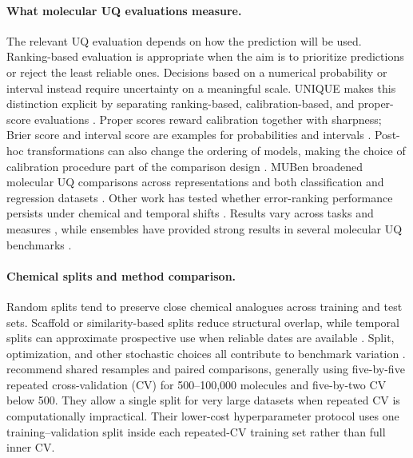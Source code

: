 \paragraph{What molecular UQ evaluations measure.}
The relevant UQ evaluation depends on how the prediction will be used. Ranking-based evaluation is
appropriate when the aim is to prioritize predictions or reject the least reliable ones. Decisions based on a
numerical probability or interval instead require uncertainty on a meaningful scale. UNIQUE makes
this distinction explicit by separating ranking-based, calibration-based, and proper-score
evaluations \citep{lanini2024unique}. Proper scores reward calibration together with sharpness;
Brier score and interval score are
examples for probabilities and intervals \citep{gneiting2007strictly}. Post-hoc transformations can
also change the ordering of models, making the choice of calibration procedure part of the
comparison design \citep{ranjan2024posthoc}. MUBen broadened molecular UQ comparisons across
representations and both classification and regression datasets \citep{li2024muben}. Other work has
tested whether error-ranking performance persists under chemical and temporal shifts
\citep{parrondopizarro2026shifts}. Results vary across tasks and measures
\citep{hirschfeld2020uncertainty}, while ensembles have provided strong results in several molecular
UQ benchmarks \citep{scalia2020evaluating,li2024muben}.

\paragraph{Chemical splits and method comparison.}
Random splits tend to preserve close chemical analogues across training and test sets. Scaffold or
similarity-based splits reduce structural overlap, while temporal splits can approximate prospective
use when reliable dates are available \citep{yang2019analyzing,sheridan2013timesplit}. Split,
optimization, and other stochastic choices all contribute to benchmark variation
\citep{bouthillier2021accounting,ash2025practically}. \citet{ash2025practically} recommend shared
resamples and paired comparisons, generally using five-by-five repeated cross-validation (CV) for
500--100,000 molecules and five-by-two CV below 500. They allow a single split for very large
datasets when repeated CV is computationally impractical. Their lower-cost
hyperparameter protocol uses one training--validation split inside each repeated-CV training set
rather than full inner CV.

